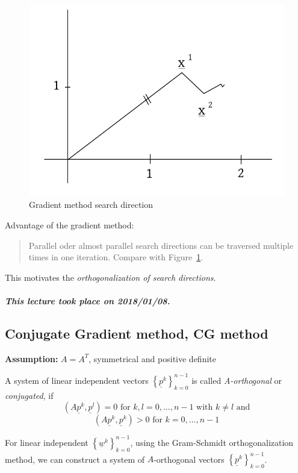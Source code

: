 \documentclass{article}
\newcommand{\dateref}[1]{\paragraph{\textit{This lecture took place on #1.}}}
\begin{document}
\begin{figure}[!h]
  \begin{center}
    \includegraphics{img/gradient_method_search_direction.pdf}
    \caption{Gradient method search direction}
    \label{img:searchdir}
  \end{center}
\end{figure}
Advantage of the gradient method:
\begin{quote}
  Parallel oder almost parallel search directions can be traversed multiple times in one iteration.
  Compare with Figure~\ref{img:searchdir}.
\end{quote}
This motivates the \emph{orthogonalization of search directions}.

\dateref{2018/01/08}

\subsection[Conjugate gradient method]{Conjugate Gradient method, CG method}

\textbf{Assumption:} $A = A^T$, symmetrical and positive definite

A system of linear independent vectors $\left\{\underline{p}^k\right\}_{k=0}^{n-1}$ is called
\emph{A-orthogonal} or \emph{conjugated}, if
\[ (A\underline{p}^k, \underline{p}^l) = 0 \text{ for } k,l=0,\ldots,n-1 \text{ with } k\neq l \text{ and} \]
\[ (A \underline{p}^k, \underline{p}^k) > 0 \text{ for } k = 0,\ldots,n-1 \]

For linear independent $\left\{\underline{w}^k\right\}_{k=0}^{n-1}$, using the Gram-Schmidt orthogonalization method,
we can construct a system of $A$-orthogonal vectors $\left\{\underline{p}^k\right\}_{k=0}^{n-1}$.
\end{document}
